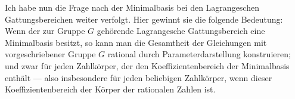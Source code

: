 Ich habe nun die Frage nach der Minimalbasis bei den Lagrangeschen Gattungsbereichen weiter verfolgt. Hier gewinnt sie die folgende Bedeutung: \glqq{}Wenn der zur Gruppe $G$ gehörende Lagrangesche Gattungsbereich eine Minimalbasis besitzt, so kann man die Gesamtheit der Gleichungen mit vorgeschriebener Gruppe $G$ rational durch Parameterdarstellung konstruieren; und zwar für jeden Zahlkörper, der den Koeffizientenbereich der Minimalbasis enthält --- also insbesondere für jeden beliebigen Zahlkörper, wenn dieser Koeffizientenbereich der Körper der rationalen Zahlen ist.\grqq{}
